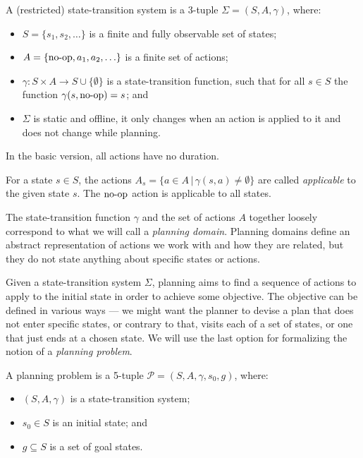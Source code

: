 \begin{defn}\label{defn:state-transition-sys}
A (restricted) state-transition system is a 3-tuple $\Sigma = (S, A, \gamma)$, where:
\begin{itemize}
\item $S = \{s_1, s_2, \ldots\}$ is a finite and fully observable set of states;
\item $A = \{\operatorname{\textrm{no-op}}, a_1, a_2, \ldots\}$ is a finite set of actions;
\item $\gamma: S \times A \to S \cup \{\emptyset\}$ is a state-transition function,
such that for all $s \in S$ the function $\gamma(s, \operatorname{\textrm{no-op}}) = s$; and
\item $\Sigma$ is static and offline,
it only changes when an action is applied to it and does not change while planning.
\end{itemize}
In the basic version, all actions have no duration.
\end{defn}

For a state $s \in S$, the actions $A_s = \{a \in A \,|\, \gamma(s, a) \neq \emptyset\}$ are called \textit{applicable}
to the given state $s$. The $\operatorname{\textrm{no-op}}$ action is applicable to all states.

The state-transition function $\gamma$ and the set of actions $A$ together loosely correspond to what we will call a \textit{planning domain}.
Planning domains define an abstract representation of actions we work with
and how they are related,
but they do not state anything about specific states or actions.

Given a state-transition system $\Sigma$, planning aims to find a
sequence of actions to apply to the initial state in order to achieve some objective.
The objective can be defined in various ways --- we might want the planner
to devise a plan that
does not enter specific states, or contrary to that, visits each of a set of states,
or one that just ends at a chosen state.
We will use the last option for formalizing the notion of a \textit{planning problem}.

\begin{defn}\label{defn:planning-problem}\citep[Part~I]{Ghallab2004}
A planning problem is a 5-tuple $\mathcal{P} = (S, A, \gamma, s_0, g)$, where:
\begin{itemize}
\item $(S, A, \gamma)$ is a state-transition system;
\item $s_0 \in S$ is an initial state; and
\item $g \subseteq S$ is a set of goal states.
\end{itemize}
\end{defn}

